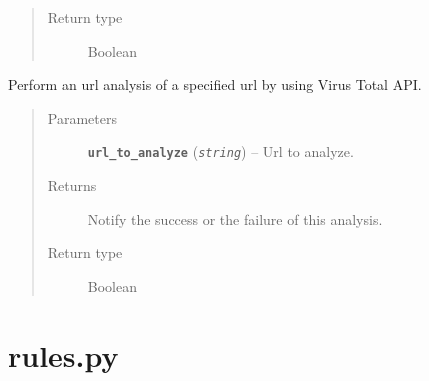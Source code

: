 \documentclass[letterpaper,10pt,oneside]{sphinxmanual}
\begin{document}
\begin{fulllineitems}
\begin{fulllineitems}
\begin{quote}
\begin{description}
\item[{Return type}] \leavevmode
Boolean

\end{description}\end{quote}

\end{fulllineitems}


\begin{fulllineitems}
\label{index:lib.vt.Vt.url_analysis}
Perform an url analysis of a specified url by using
Virus Total API.
\begin{quote}\begin{description}
\item[{Parameters}] \leavevmode
\textbf{\texttt{url\_to\_analyze}} (\emph{\texttt{string}}) -- Url to analyze.

\item[{Returns}] \leavevmode
Notify the success or the failure of this analysis.

\item[{Return type}] \leavevmode
Boolean

\end{description}\end{quote}

\end{fulllineitems}


\end{fulllineitems}



\section{rules.py}
\label{index:rules-py}\label{index:module-lib.rules}
\end{document}
